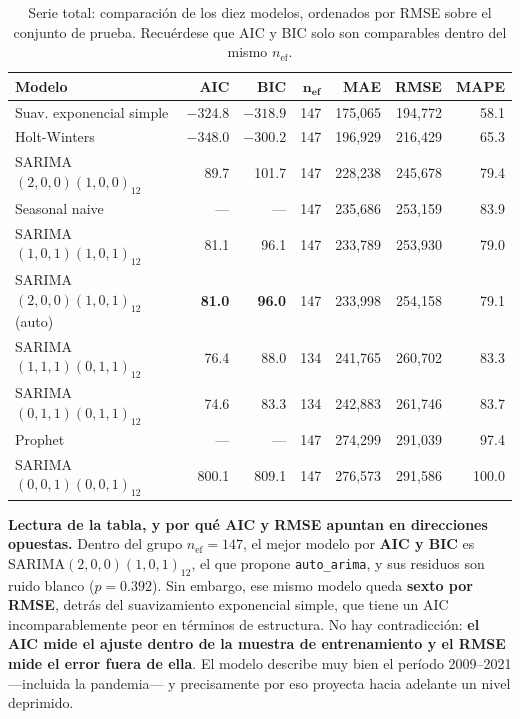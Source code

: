 \documentclass[12pt,letterpaper]{article}
\begin{document}
\begin{table}[H]
\centering
\small
\begin{tabular}{lrrrrrr}
\toprule
\textbf{Modelo} & \textbf{AIC} & \textbf{BIC} & $\boldsymbol{n_{\text{ef}}}$ & \textbf{MAE} & \textbf{RMSE} & \textbf{MAPE} \\
\midrule
Suav. exponencial simple             & $-324.8$ & $-318.9$ & 147 & 175{,}065 & 194{,}772 & 58.1 \\
Holt-Winters                         & $-348.0$ & $-300.2$ & 147 & 196{,}929 & 216{,}429 & 65.3 \\
SARIMA$(2,0,0)(1,0,0)_{12}$          & 89.7 & 101.7 & 147 & 228{,}238 & 245{,}678 & 79.4 \\
Seasonal naive                       & --- & --- & 147 & 235{,}686 & 253{,}159 & 83.9 \\
SARIMA$(1,0,1)(1,0,1)_{12}$          & 81.1 & 96.1 & 147 & 233{,}789 & 253{,}930 & 79.0 \\
SARIMA$(2,0,0)(1,0,1)_{12}$ \small{(auto)} & \textbf{81.0} & \textbf{96.0} & 147 & 233{,}998 & 254{,}158 & 79.1 \\
SARIMA$(1,1,1)(0,1,1)_{12}$          & 76.4 & 88.0 & 134 & 241{,}765 & 260{,}702 & 83.3 \\
SARIMA$(0,1,1)(0,1,1)_{12}$          & 74.6 & 83.3 & 134 & 242{,}883 & 261{,}746 & 83.7 \\
Prophet                              & --- & --- & 147 & 274{,}299 & 291{,}039 & 97.4 \\
SARIMA$(0,0,1)(0,0,1)_{12}$          & 800.1 & 809.1 & 147 & 276{,}573 & 291{,}586 & 100.0 \\
\bottomrule
\end{tabular}
\caption{Serie total: comparación de los diez modelos, ordenados por RMSE sobre el conjunto de
prueba. Recuérdese que AIC y BIC solo son comparables dentro del mismo $n_{\text{ef}}$.}
\end{table}

\textbf{Lectura de la tabla, y por qué AIC y RMSE apuntan en direcciones opuestas.} Dentro del
grupo $n_{\text{ef}} = 147$, el mejor modelo por \textbf{AIC y BIC} es
SARIMA$(2,0,0)(1,0,1)_{12}$, el que propone \texttt{auto\_arima}, y sus residuos son ruido
blanco ($p = 0.392$). Sin embargo, ese mismo modelo queda \textbf{sexto por RMSE}, detrás del
suavizamiento exponencial simple, que tiene un AIC incomparablemente peor en términos de
estructura. No hay contradicción: \textbf{el AIC mide el ajuste dentro de la muestra de
entrenamiento y el RMSE mide el error fuera de ella}. El modelo describe muy bien el período
2009--2021 ---incluida la pandemia--- y precisamente por eso proyecta hacia adelante un nivel
deprimido.
\end{document}
